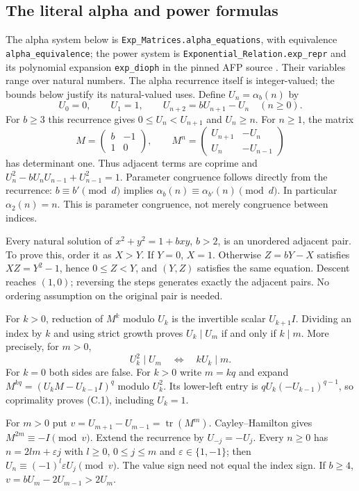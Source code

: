 \subsection{The literal alpha and power formulas}
The alpha system below is \texttt{Exp\_Matrices.alpha\_equations},
with equivalence \texttt{alpha\_equivalence}; the power system is
\texttt{Exponential\_Relation.exp\_repr} and its polynomial expansion
\texttt{exp\_dioph} in the pinned AFP source \cite{afp}.
Their variables range over natural numbers. The alpha recurrence itself
is integer-valued; the bounds below justify its natural-valued uses.
Define $U_n=\alpha_b(n)$ by
\[
 U_0=0,\qquad U_1=1,\qquad U_{n+2}=bU_{n+1}-U_n\quad(n\ge0).
\]
For $b\ge3$ this recurrence gives
$0\le U_n<U_{n+1}$ and $U_n\ge n$. For $n\ge1$, the matrix
\[
 M=\begin{pmatrix}b&-1\\1&0\end{pmatrix},\qquad
 M^n=\begin{pmatrix}U_{n+1}&-U_n\\U_n&-U_{n-1}\end{pmatrix}
\]
has determinant one. Thus adjacent terms are coprime and
$U_n^2-bU_nU_{n-1}+U_{n-1}^2=1$.
Parameter congruence follows directly from the recurrence:
$b\equiv b'\pmod d$ implies
$\alpha_b(n)\equiv\alpha_{b'}(n)\pmod d$.
In particular $\alpha_2(n)=n$. This is parameter congruence,
not merely congruence between indices.

Every natural solution of $x^2+y^2=1+bxy$, $b>2$, is an unordered
adjacent pair. To prove this, order it as $X>Y$. If $Y=0$, $X=1$.
Otherwise $Z=bY-X$ satisfies $XZ=Y^2-1$, hence $0\le Z<Y$,
and $(Y,Z)$ satisfies the same equation. Descent reaches $(1,0)$;
reversing the steps generates exactly the adjacent pairs.
No ordering assumption on the original pair is needed.

For $k>0$, reduction of $M^k$ modulo $U_k$ is the invertible scalar
$U_{k+1}I$. Dividing an index by $k$ and using strict growth proves
$U_k\mid U_m$ if and only if $k\mid m$. More precisely, for $m>0$,
\[
                    U_k^2\mid U_m\quad\Longleftrightarrow\quad
                         kU_k\mid m.                           \tag{C.1}
\]
For $k=0$ both sides are false. For $k>0$ write $m=kq$ and expand
$M^{kq}=(U_kM-U_{k-1}I)^q$ modulo $U_k^2$. Its lower-left entry is
$qU_k(-U_{k-1})^{q-1}$, so coprimality proves (C.1), including $U_k=1$.

For $m>0$ put $v=U_{m+1}-U_{m-1}=\operatorname{tr}(M^m)$.
Cayley--Hamilton gives $M^{2m}\equiv-I\pmod v$.
Extend the recurrence by $U_{-j}=-U_j$. Every $n\ge0$ has
$n=2lm+\varepsilon j$ with $l\ge0$, $0\le j\le m$ and
$\varepsilon\in\{1,-1\}$; then
$U_n\equiv(-1)^l\varepsilon U_j\pmod v$.
The value sign need not equal the index sign. If $b\ge4$,
$v=bU_m-2U_{m-1}>2U_m$.

